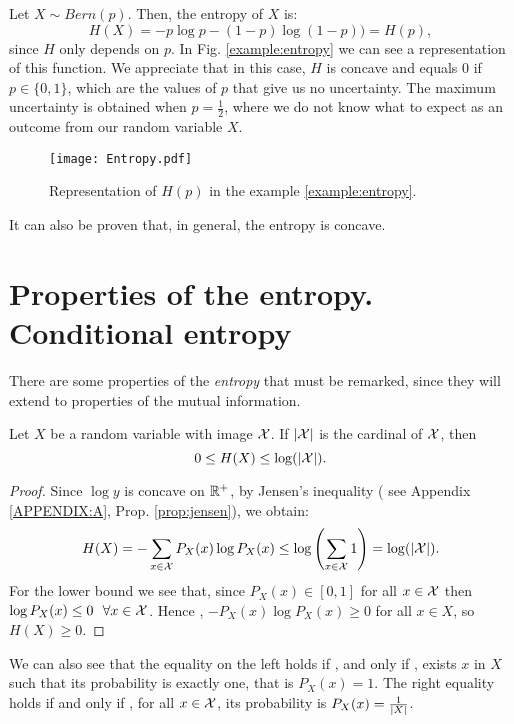 \begin{nexample}
    \label{example:entropy}
Let $X \sim Bern(p)$. Then, the entropy of $X$ is:
\[
H(X) = -p \log p - (1-p) \log(1-p)) = H(p),
\]
since $H$ only depends on $p$. In Fig. \ref{example:entropy} we can see a representation of this function. We appreciate that in this case, $H$ is concave and equals $0$ if $p \in \{0,1\}$, which are the values of $p$ that give us no uncertainty. The maximum uncertainty is obtained when $p=\frac{1}{2}$, where we do not know what to expect as an outcome from our random variable $X$.

\begin{figure}[H]
    \label{fig:example:entropy}
    \centering
    \texttt{[image: Entropy.pdf]}

      \caption{Representation of $H(p)$ in the example \ref{example:entropy}.}
\end{figure}

\end{nexample}
It can also be proven that, in general, the entropy is concave. 


\section{Properties of the entropy. Conditional entropy}

There are some properties of the \emph{entropy} that must be remarked, since they will extend to properties of the mutual information.


\begin{nprop}\label{entr:prop:1}
    Let $X$ be a random variable with image $\mathcal{X}$. If $|\mathcal{X}|$ is the cardinal of $\mathcal{X}$, then
    $$
0 \leq H(X) \leq \log(|\mathcal{X}|).
    $$
\end{nprop}
\begin{proof}
    Since $\log y$ is concave on $\mathbb{R}^+$, by Jensen's inequality ( see Appendix \ref{APPENDIX:A}, Prop. \ref{prop:jensen}), we obtain:
    $$
    H(X) = - \sum_{x \in \mathcal{X}}P_X (x)\log P_X(x) \leq \log\left(\sum_{x \in \mathcal{X}} 1\right) = \log(|\mathcal{X}|).
    $$
    For the lower bound we see that, since $P_X(x) \in [0,1]$ for all  $x \in \mathcal{X} $ then $\log P_X(x) \leq 0 \ \ \forall x \in \mathcal{X}$. Hence , $-P_X(x) \log P_X(x) \geq 0$ for all $x \in X$, so $H(X) \geq 0$.
\end{proof}
We can also see that the equality on the left holds if , and only if , exists $ x $ in  $X$ such that its probability is exactly one, that is $P_X(x) = 1$. The right equality holds if and only if , for all $x \in \mathcal{X}$, its probability is $P_X(x) = \frac{1}{\left\lvert X\right\rvert}$.

